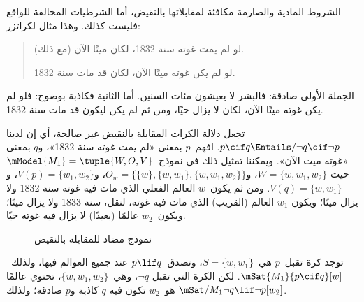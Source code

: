 \documentclass[../../../include/open-logic-section]{subfiles}
\begin{document}


الشروط المادية والصارمة مكافئة لمقابلاتها بالنقيض، أما الشرطيات المخالفة
للواقع فليست كذلك. وهذا مثال لكراتزر:
\begin{quote}
  لو لم يمت غوته سنة 1832، لكان ميتًا الآن (مع ذلك).

  لو لم يكن غوته ميتًا الآن، لكان قد مات سنة 1832.
\end{quote}
الجملة الأولى صادقة: فالبشر لا يعيشون مئات السنين. أما الثانية فكاذبة
بوضوح: فلو لم يكن غوته ميتًا الآن، لكان لا يزال حيًا، ومن ثم لم يكن
ليكون قد مات سنة 1832.

\begin{ex}
  تجعل دلالة الكرات المقابلة بالنقيض غير صالحة، أي إن لدينا
  $p \cif q \Entails/ \lnot q \cif \lnot p$. افهم~$p$ بمعنى «لم يمت
  غوته سنة 1832»، و$q$ بمعنى «غوته ميت الآن». ويمكننا تمثيل ذلك في
  نموذج~$\mModel{M_1} = \tuple{W, O, V}$ حيث
  $W = \{w, w_1, w_2\}$،
  و$O_w = \{\{w\}, \{w, w_1\}, \{w, w_1, w_2\}\}$،
  و$V(p) = \{w_1, w_2\}$، و$V(q) = \{w, w_1\}$. ومن ثم يكون~$w$
  العالم الفعلي الذي مات فيه غوته سنة 1832 ولا يزال ميتًا؛ ويكون
  $w_1$ العالم (القريب) الذي مات فيه غوته، لنقل، سنة 1833 ولا يزال
  ميتًا؛ ويكون~$w_2$ عالمًا (بعيدًا) لا يزال فيه غوته حيًا.
\begin{figure}
\begin{center}
\caption{نموذج مضاد للمقابلة بالنقيض}
\end{center}
\end{figure}
توجد كرة تقبل~$p$ هي~$S = \{w, w_1\}$، وتصدق~$p \lif q$ عند جميع
العوالم فيها، ولذلك~$\mSat{M_1}{p \cif q}[w]$. لكن الكرة التي تقبل
$\lnot q$، وهي~$\{w, w_1, w_2\}$، تحتوي عالمًا هو~$w_2$ تكون فيه
$q$ كاذبة و$p$ صادقة؛ ولذلك
$\mSat/{M_1}{\lnot q \lif \lnot p}[w_2]$.
\end{ex}
\end{document}
